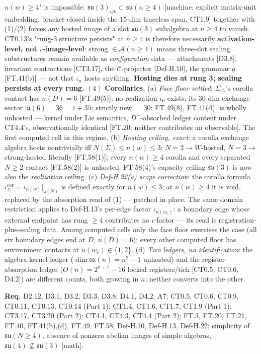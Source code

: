 \documentclass[11pt,openany]{report}
\theoremstyle{canonplain}
\theoremstyle{canondef}
\begin{document}
$n(w)\ge4$" is impossible: $\mathfrak{su}(3)_{ijk}\subset\mathfrak{su}(n\ge4)$ [machine: explicit matrix-unit embedding, bracket-closed inside the $15$-dim traceless span, CT1.9] together with (1)/(2) forces any hosted image of a slot $\mathfrak{su}(3)$ subalgebra at $n\ge4$ to vanish. CT0.13's "rung-3 structure persists" at $n\ge4$ is therefore necessarily \textbf{activation-level, not $\iota$-image-level}: strong $\in\mathcal A(n\ge4)$ means three-slot sealing substructures remain available as \textit{configuration} data — attachments [D3.8], invariant contractions [CT3.17], the $\mathcal C$-projector [Def-H.10], the grammar $g$ [FT.41(b)] — not that $\iota_n$ hosts anything. \textbf{Hosting dies at rung 3; sealing persists at every rung.} $(4)$ \textbf{Corollaries.} (a) \textit{Face floor settled}: $\Sigma_\triangle$'s corolla contact has $n(D)=6$ [FT.49(5)]: no realization $\iota_6$ exists; its $30$-dim exchange sector [$\mathfrak u(6)=36=1+35$; strictly new $=30$: FT.49(8), FT.41(d)] is wholly unhosted — kernel under Lie semantics, $D^-$-absorbed ledger content under CT4.4's, observationally identical [FT.20: neither contributes an observable]. The first computed cell in this regime. (b) \textit{Hosting ceiling, exact}: a corolla exchange algebra hosts nontrivially iff $N(\Sigma)\le n(w)\le3$: $N=2\to W$-hosted, $N=3\to$ strong-hosted literally [FT.58(1)]; every $n(w)\ge4$ corolla and every separated $N\ge2$ contact [FT.58(2)] is unhosted. FT.58(4)'s capacity ceiling $\mathfrak{su}(3)$ is now also the \textit{realization} ceiling. (c) \textit{Def-H.22(a) scope correction}: the corolla formula $\iota_\Sigma^{\mathrm{cor}}=\iota_{n(w)}|_{\mathfrak u(N)}$ is defined exactly for $n(w)\le3$; at $n(w)\ge4$ it is void, replaced by the absorption read of (1) — patched in place. The same domain restriction applies to Def-H.13's per-edge factor $\iota_{n(w_e)}$: a boundary edge whose external endpoint has rung $\ge4$ contributes no $\iota$-factor — its read is registration-plus-sealing data. Among computed cells only the face floor exercises the case (all six boundary edges end at $D$, $n(D)=6$); every other computed floor has environment contacts at $n(w_e)\in\{1,2\}$. (d) \textit{Two ledgers, no identification}: the algebra-kernel ledger ($\dim\mathfrak{su}(n)=n^2-1$ unhosted) and the register-absorption ledger ($O(n)=2^{n+1}-16$ locked registers/tick [CT0.5, CT0.6, D4.2]) are different counts, both growing in $n$; neither converts into the other.

\textbf{Req.} D2.12, D3.1, D3.2, D3.3, D3.8; D4.1, D4.2; A7; CT0.5, CT0.6, CT0.9, CT0.11, CT0.13, CT0.14 (Part 1); CT1.4, CT1.6, CT1.7, CT1.9 (Part 1); CT3.17, CT3.20 (Part 2); CT4.1, CT4.3, CT4.4 (Part 2); FT.3, FT.20, FT.21, FT.40, FT.41(b),(d), FT.49, FT.58; Def-H.10, Def-H.13, Def-H.22; simplicity of $\mathfrak{su}(N\ge4)$, absence of nonzero abelian images of simple algebras, $\mathfrak{su}(4)\not\subseteq\mathfrak{su}(3)$ [math].
\end{document}
